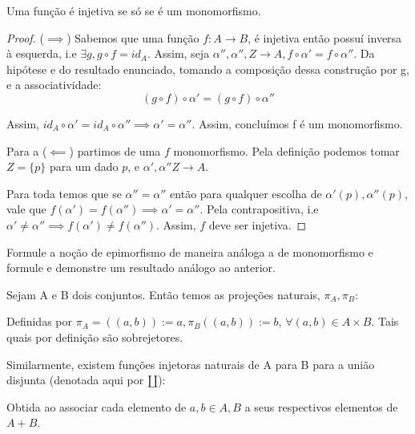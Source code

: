 \documentclass[../main]{subfiles}
\begin{document}
\begin{prop}
    Uma função é injetiva se só se é um monomorfismo.
\end{prop}
\begin{proof}
    (\(\implies\)) Sabemos que uma função \(f: A \to B\), é injetiva então
    possuí inversa à esquerda, i.e \(\exists g, g \circ f = id_A\). Assim, seja
    \(\alpha'', \alpha'', Z \to A, f \circ \alpha' = f \circ \alpha''\). Da
    hipótese e do resultado enunciado, tomando a composição dessa construção por
    g, e a associatividade: 
    \[(g \circ f) \circ \alpha' = (g \circ f) \circ \alpha''\]

    Assim, \(id_A \circ \alpha' = id_A \circ \alpha'' \implies \alpha' =
    \alpha''\). Assim, concluímos f é um monomorfismo.

    Para a (\(\impliedby \)) partimos de uma \(f\) monomorfismo. Pela definição
    podemos tomar \(Z = \{p\}\) para um dado \(p\), e \(\alpha', \alpha'' Z \to
    A\). 
    
    Para toda temos que se \(\alpha'' = \alpha''\) então para qualquer escolha
    de \(\alpha'(p), \alpha''(p)\), vale que \(f(\alpha') = f(\alpha'') \implies
    \alpha' = \alpha''\). Pela contrapositiva, i.e \(\alpha' \neq \alpha''
    \implies f(\alpha') \neq f(\alpha'')\). Assim, \(f\) deve ser injetiva. 
\end{proof}

\begin{exercise}
    Formule a noção de epimorfismo de maneira análoga a de monomorfismo e
    formule e demonstre um resultado análogo ao anterior.
\end{exercise}

\begin{example}
    Sejam A e B dois conjuntos. Então temos as projeções naturais, \(\pi_A,
    \pi_B\): 
    \begin{center}
\end{center}
    Definidas por \(\pi_A = ((a, b)) := a, \pi_B((a, b)) := b\), \(\forall (a,
    b) \in A \times B\). Tais quais por definição são sobrejetores.
\end{example}
\begin{example}
    Similarmente, existem funções injetoras naturais de A para B para a união
    disjunta (denotada aqui por \(\amalg\)):
    \begin{center}
    \end{center}

    Obtida ao associar cada elemento de \(a, b \in A, B\) a seus respectivos
    elementos de \(A + B\).
\end{example}
\end{document}
